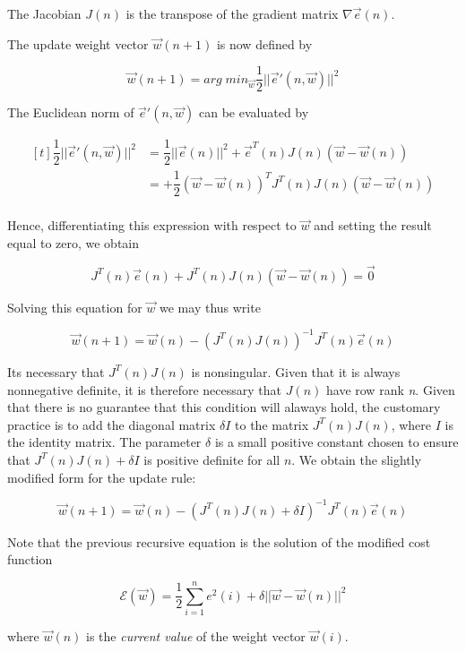 \documentclass[twocolumn]{article}
\begin{document}
The Jacobian $ J (n) $ is the transpose of the gradient matrix $ \nabla \vec{e} (n) $.

The update weight vector $ \vec{w} (n + 1) $ is now defined by

$$ \vec{w} (n + 1) = arg\; min_{ \vec{w}} { \dfrac{1}{2} || \vec{e}' (n, \vec{w}) ||^{2}} $$

The Euclidean norm of $ \vec{e}' (n, \vec{w}) $ can be evaluated by

$$ \begin{aligned}[t]
	\dfrac{1}{2}|| \vec{e}' (n, \vec{w}) ||^{2} &= \dfrac{1}{2}|| \vec{e} (n)||^{2} + \vec{e}^{T} (n) J (n) ( \vec{w} - \vec{w} (n))\\
						    &= + \dfrac{1}{2} ( \vec{w} - \vec{w} (n))^{T} J^{T} (n) J (n) ( \vec{w} - \vec{w} (n))\\
\end{aligned} $$

Hence, differentiating this expression with respect to $ \vec{w} $ and setting the result equal to zero, we obtain

$$ J^{T} (n) \vec{e} (n) + J^{T} (n) J (n) ( \vec{w} - \vec{w} (n)) = \vec{0} $$

Solving this equation for $ \vec{w} $ we may thus write

$$ \vec{w} (n + 1) = \vec{w} (n) - ( J^{T} (n) J (n))^{-1} J^{T} (n) \vec{e} (n) $$

Its necessary that $ J^{T} (n) J (n) $ is nonsingular. Given that it is always nonnegative definite, it is therefore necessary that $ J (n) $ have row rank \textit{n}. Given that there is no guarantee that this condition will alaways hold, the customary practice is to add the diagonal matrix $ \delta I $ to the matrix $ J^{T} (n) J (n) $, where $ I $ is the identity matrix. The parameter $ \delta $ is a small positive constant chosen to ensure that $ J^{T} (n) J (n) + \delta I $ is positive definite for all $ n $. We obtain the slightly modified form for the update rule:

$$ \vec{w} (n + 1) = \vec{w} (n) - (J^{T} (n) J (n) + \delta I)^{-1} J^{T} (n) \vec{e} (n) $$

Note that the previous recursive equation is the solution of the modified cost function

$$ \mathcal{E} ( \vec{w}) = \dfrac{1}{2} { \sum_{i = 1}^{n} e^{2} (i) + \delta || \vec{w} - \vec{w} (n)||^{2}} $$

\noindent where $ \vec{w} (n) $ is the \textit{current value} of the weight vector $ \vec{w} (i)  $.
\end{document}
